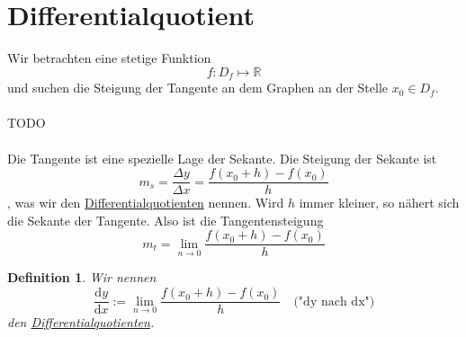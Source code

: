 \documentclass{report}
\newtheorem{mydef}{Definition}
\begin{document}
\section{Differentialquotient}
Wir betrachten eine stetige Funktion
\begin{equation}f: D_f \mapsto \mathbb{R}\end{equation}
und suchen die Steigung der Tangente an dem Graphen an der Stelle $x_0 \in D_f$.
\\\\TODO\\\\
Die Tangente ist eine spezielle Lage der Sekante. Die Steigung der Sekante ist
\begin{equation}m_s = \frac{\Delta y}{\Delta x} = \frac{f(x_0 + h) - f(x_0)}{h}\end{equation}
, was wir den \underline{Differentialquotienten} nennen. Wird $h$ immer kleiner, so nähert sich die Sekante der Tangente. Also ist die Tangentensteigung
\begin{equation}m_t = \lim_{n \to 0} \frac{f(x_0 + h) - f(x_0)}{h}\end{equation}
\begin{mydef}Wir nennen
\begin{equation}\frac{\mathrm{d}y}{\mathrm{d}x} := \lim_{n \to 0} \frac{f(x_0 + h) - f(x_0)}{h} \quad \mbox{("dy nach dx")}\end{equation}
den \underline{Differentialquotienten}.\end{mydef}
\end{document}

